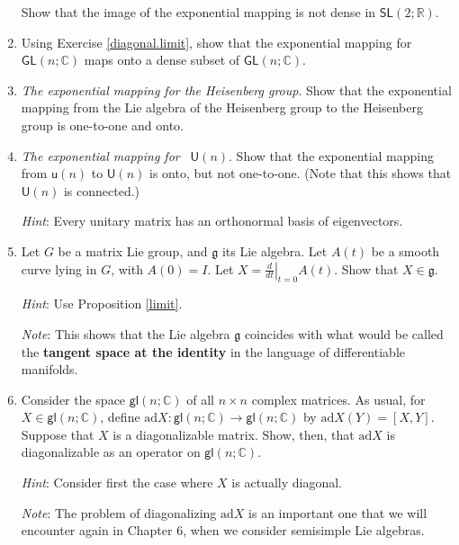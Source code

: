 \documentclass{amsbook}
\let \frak = \mathfrak
\theoremstyle{plain}
\numberwithin{equation}{chapter}
\numberwithin{theorem}{chapter}
\begin{document}
\begin{enumerate}
Show that the image of the exponential mapping is not dense in $\mathsf{SL}%
\left(  2;\mathbb{R}\right)  $.

\item  Using Exercise \ref{diagonal.limit}, show that the exponential mapping
for $\mathsf{GL}(n;\mathbb{C})$ maps onto a dense subset of $\mathsf{GL}%
(n;\mathbb{C})$.

\item \label{exp.heisenberg}\textit{The exponential mapping for the Heisenberg
group}. Show that the exponential mapping from the Lie algebra of the
Heisenberg group to the Heisenberg group is one-to-one and onto.

\item \label{exp.un}\textit{The exponential mapping for}\emph{\ }%
$\mathsf{U}(n)$. Show that the exponential mapping from $\mathsf{u}(n)$ to
$\mathsf{U}(n)$ is onto, but not one-to-one. (Note that this shows that
$\mathsf{U}(n)$ is connected.)

\textit{Hint}: Every unitary matrix has an orthonormal basis of eigenvectors.

\item \label{tangent.space}Let $G$ be a matrix Lie group, and $\frak{g}$ its
Lie algebra. Let $A(t)$ be a smooth curve lying in $G$, with $A(0)=I$. Let
$X=\left.  \tfrac{d}{dt}\right|  _{t=0}A(t)$. Show that $X\in\frak{g}$.

\textit{Hint}: Use Proposition \ref{limit}.

\textit{Note}: This shows that the Lie algebra $\frak{g}$ coincides with what
would be called the \textbf{tangent space at the identity} in the language of
differentiable manifolds.

\item \label{ad.diagonal}Consider the space $\mathsf{gl}(n;\mathbb{C})$ of all
$n\times n$ complex matrices. As usual, for $X\in\mathsf{gl}(n;\mathbb{C})$,
define $\mathrm{ad}X:\mathsf{gl}(n;\mathbb{C})\rightarrow\mathsf{gl}%
(n;\mathbb{C})$ by $\mathrm{ad}X(Y)=[X,Y]$. Suppose that $X$ is a
diagonalizable matrix. Show, then, that $\mathrm{ad}X$ is diagonalizable as an
operator on $\mathsf{gl}(n;\mathbb{C})$.

\textit{Hint}: Consider first the case where $X$ is actually diagonal.

\textit{Note}: The problem of diagonalizing $\mathrm{ad}X$ is an important one
that we will encounter again in Chapter 6, when we consider semisimple Lie algebras.
\end{enumerate}
\end{document}
